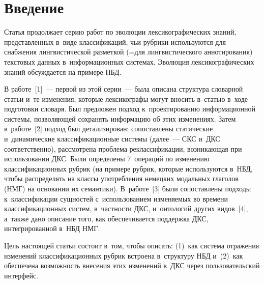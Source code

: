      
  



\thispagestyle{headings}

\begin{multicols}{2}

\label{st\stat}
     
     
\section{Введение}

\vspace*{-2pt}

  Статья продолжает серию работ по эволюции лексикографических 
знаний, представленных в~виде классификаций, чьи рубрики используются 
для снабжения лингвистической разметкой (=\;для лингвистического 
аннотирования) текстовых данных в~информационных системах. Эволюция 
лексикографических знаний обсуждается на примере НБД.
  
  В работе~[1]~--- первой из этой серии~--- была описана структура 
словарной статьи и~те изменения, которые лексикографы могут вносить 
в~\mbox{статью} в~ходе подготовки словаря. Был предложен подход 
к~проектированию информационной системы, позволяющей сохранять 
информацию об этих изменениях. Затем в~работе~[2] подход был 
детализирован: сопоставлены статические и~динамические 
классификационные системы (далее~--- СКС и~ДКС соответственно), 
рассмотрена проблема реклассификации, возникающая при использовании 
ДКС. Были определены 7~операций по изменению классификационных 
рубрик (на примере рубрик, которые используются в~НБД, чтобы 
распределять на классы употребления немецких модальных глаголов (НМГ) 
на основании их семантики). В~работе~[3] были сопоставлены подходы 
к~классификации сущностей с~использованием изменяемых во времени 
классификационных систем, в~частности ДКС, и~онтологий других 
видов~[4], а~также дано описание того, как обеспечивается поддержка 
ДКС, интегрированной в~НБД НМГ.
  
  Цель настоящей \mbox{статьи} состоит в~том, чтобы описать: (1)~как система 
отражения изменений классификационных рубрик встроена в~структуру 
НБД и~(2)~как обеспечена возможность внесения этих изменений в~ДКС 
через пользовательский интерфейс.


\end{multicols}
